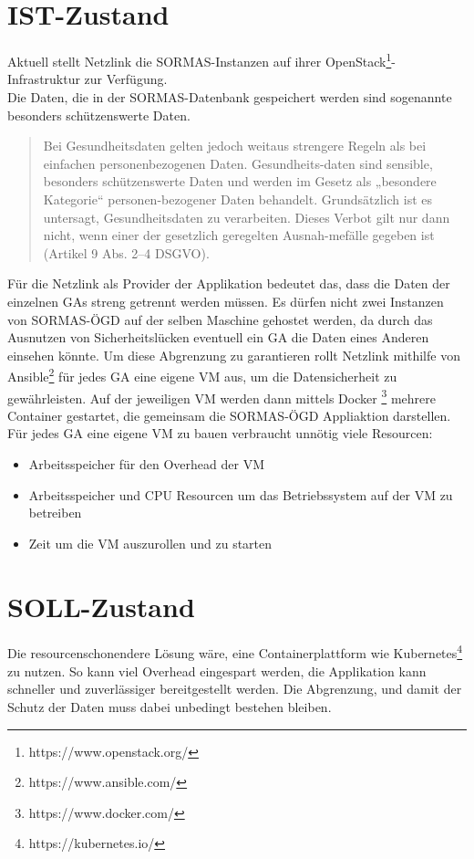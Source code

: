 \section{IST-Zustand}
Aktuell stellt Netzlink die \ac{SORMAS}-Instanzen auf ihrer OpenStack\footnote{https://www.openstack.org/}-Infrastruktur zur Verfügung. 
\\
Die Daten, die in der \ac{SORMAS}-Datenbank gespeichert werden sind sogenannte besonders schützenswerte Daten.
\begin{quote}
    Bei Gesundheitsdaten gelten jedoch weitaus strengere Regeln als bei einfachen personenbezogenen Daten. Gesundheits-daten sind sensible, besonders schützenswerte Daten und werden im Gesetz als „besondere Kategorie“ personen-bezogener Daten behandelt. Grundsätzlich ist es untersagt, Gesundheitsdaten zu verarbeiten. Dieses Verbot gilt nur dann nicht, wenn einer der gesetzlich geregelten Ausnah-mefälle gegeben ist (Artikel 9 Abs. 2–4 DSGVO). 
    \cite{Gesundheitsdatenschutz}
\end{quote}
Für die Netzlink als Provider der Applikation bedeutet das, dass die Daten der einzelnen \ac{GAs} streng getrennt werden müssen. 
Es dürfen nicht zwei Instanzen von \ac{SORMAS-ÖGD} auf der selben Maschine gehostet werden, da durch das Ausnutzen von Sicherheitslücken eventuell ein \ac{GA} die Daten eines Anderen einsehen könnte.
Um diese Abgrenzung zu garantieren rollt Netzlink mithilfe von Ansible\footnote{https://www.ansible.com/} für jedes \ac{GA} eine eigene \ac{VM} aus, um die Datensicherheit zu gewährleisten.
Auf der jeweiligen \ac{VM} werden dann mittels Docker \footnote{https://www.docker.com/} mehrere Container gestartet, die gemeinsam die \ac{SORMAS-ÖGD} Appliaktion darstellen.
\\
Für jedes \ac{GA} eine eigene VM zu bauen verbraucht unnötig viele Resourcen:
\begin{itemize}
    \item Arbeitsspeicher für den Overhead der \ac{VM}
    \item Arbeitsspeicher und CPU Resourcen um das Betriebssystem auf der \ac{VM} zu betreiben
    \item Zeit um die \ac{VM} auszurollen und zu starten 
\end{itemize}

\section{SOLL-Zustand}
Die resourcenschonendere Lösung wäre, eine Containerplattform wie Kubernetes\footnote{https://kubernetes.io/} zu nutzen.
So kann viel Overhead eingespart werden, die Applikation kann schneller und zuverlässiger bereitgestellt werden. 
Die Abgrenzung, und damit der Schutz der Daten muss dabei unbedingt bestehen bleiben.

